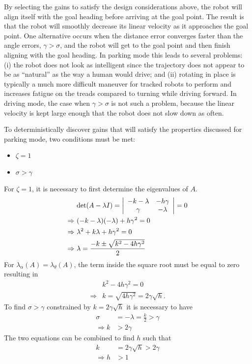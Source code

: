 By selecting the gains to satisfy the design considerations above, the robot will align itself with the goal heading before arriving at the goal point. The result is that the robot will smoothly decrease its linear velocity as it approaches the goal point. One alternative occurs when the distance error converges faster than the angle errors, $\gamma>\sigma$, and the robot will get to the goal point and then finish aligning with the goal heading. In parking mode this leads to several problems: (i) the robot does not look as intelligent since the trajectory does not appear to be as ``natural'' as the way a human would drive; and (ii) rotating in place is typically a much more difficult maneuver for tracked robots to perform and increases fatigue on the treads compared to turning while driving forward. In driving mode, the case when $\gamma>\sigma$ is not such a problem, because the linear velocity is kept large enough that the robot does not slow down as often.

To deterministically discover gains that will satisfy the properties discussed for parking mode, two conditions must be met:
\begin{itemize}
\item $\zeta = 1$
\item $\sigma > \gamma$
\end{itemize}
For $\zeta=1$, it is necessary to first determine the eigenvalues of $A$.
\begin{align*}
&\text{det}(A-\lambda I) = \left|\begin{array}{c c} -k-\lambda & -h\gamma \\ \gamma & -\lambda\end{array}\right| = 0 \\
\Rightarrow~& (-k-\lambda) (-\lambda)+h\gamma^2 = 0 \\
\Rightarrow~&\lambda^2 + k\lambda+h\gamma^2 = 0 \\
\Rightarrow~&\lambda= \frac{-k\pm\sqrt{k^2-4h\gamma^2}}{2}%
\end{align*}
For $\lambda_\alpha(A)=\lambda_\theta(A)$, the term inside the square root must be equal to zero resulting in
\begin{align*}
&k^2 - 4h\gamma^2 = 0 \\
\Rightarrow &k = \sqrt{4h\gamma^2} = 2\gamma\sqrt{h}.
\end{align*}
To find $\sigma>\gamma$ constrained by $k=2\gamma\sqrt{h}$ it is necessary to have
\begin{align*}
\sigma &= -\lambda = \tfrac{k}{2} > \gamma \\
\Rightarrow k &> 2\gamma
\end{align*}
The two equations can be combined to find $h$ such that
\begin{align*}
k &= 2\gamma\sqrt{h} > 2\gamma \\
\Rightarrow h &> 1
\end{align*}

